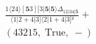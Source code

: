 \documentclass[varwidth, border=5pt]{standalone}
\begin{document}
\begin{my}
$\begin{gathered}
\scriptscriptstyle\frac{1⟨24⟩[𝟓3][3|𝟓|𝟓⟩Δ_{12|34|𝟓}}{⟨1|2+4|3]⟨2|1+4|3]²} +\\
\scriptscriptstyle(43215,\;\text{True},\;-) \phantom{+}
\end{gathered}$
\end{my}
\end{document}
